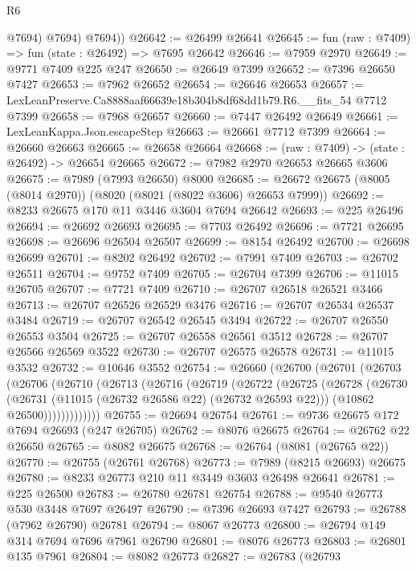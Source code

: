 \begin{lexlean}{R6}
\begin{coremodule}
            @7694)
          @7694)
        @7694))
@26642 := @26499 @26641
@26645 := fun (raw : @7409) => fun (state : @26492) => @7695 @26642
@26646 := @7959 @2970
@26649 := @9771 @7409 @225 @247
@26650 := @26649 @7399
@26652 := @7396 @26650 @7427
@26653 := @7962 @26652
@26654 := @26646 @26653
@26657 := LexLeanPreserve.Ca8888aaf66639e18b304b8df68dd1b79.R6.__fits_54 @7712 @7399
@26658 := @7968 @26657
@26660 := @7447 @26492 @26649
@26661 := LexLeanKappa.Json.escapeStep
@26663 := @26661 @7712 @7399
@26664 := @26660 @26663
@26665 := @26658 @26664
@26668 := (raw : @7409) -> (state : @26492) -> @26654 @26665
@26672 := @7982 @2970 @26653 @26665 @3606
@26675 := @7989 (@7993 @26650) @8000
@26685 := @26672 @26675 (@8005 (@8014 @2970)) (@8020 (@8021 (@8022 @3606) @26653 @7999))
@26692 := @8233 @26675 @170 @11 @3446 @3604 @7694 @26642
@26693 := @225 @26496
@26694 := @26692 @26693
@26695 := @7703 @26492
@26696 := @7721 @26695
@26698 := @26696 @26504 @26507
@26699 := @8154 @26492
@26700 := @26698 @26699
@26701 := @8202 @26492
@26702 := @7991 @7409
@26703 := @26702 @26511
@26704 := @9752 @7409
@26705 := @26704 @7399
@26706 := @11015 @26705
@26707 := @7721 @7409
@26710 := @26707 @26518 @26521 @3466
@26713 := @26707 @26526 @26529 @3476
@26716 := @26707 @26534 @26537 @3484
@26719 := @26707 @26542 @26545 @3494
@26722 := @26707 @26550 @26553 @3504
@26725 := @26707 @26558 @26561 @3512
@26728 := @26707 @26566 @26569 @3522
@26730 := @26707 @26575 @26578
@26731 := @11015 @3532
@26732 := @10646 @3552
@26754 := @26660
    (@26700
      (@26701
        (@26703
          (@26706
            (@26710
              (@26713
                (@26716
                  (@26719
                    (@26722
                      (@26725
                        (@26728
                          (@26730
                            (@26731 (@11015 (@26732 @26586 @22) (@26732 @26593 @22)))
                            (@10862 @26500)))))))))))))
@26755 := @26694 @26754
@26761 := @9736 @26675 @172 @7694 @26693 (@247 @26705)
@26762 := @8076 @26675
@26764 := @26762 @22 @26650
@26765 := @8082 @26675
@26768 := @26764 (@8081 (@26765 @22))
@26770 := @26755 (@26761 @26768)
@26773 := @7989 (@8215 @26693) @26675
@26780 := @8233 @26773 @210 @11 @3449 @3603 @26498 @26641
@26781 := @225 @26500
@26783 := @26780 @26781 @26754
@26788 := @9540 @26773 @530 @3448 @7697 @26497
@26790 := @7396 @26693 @7427
@26793 := @26788 (@7962 @26790) @26781
@26794 := @8067 @26773
@26800 := @26794 @149 @314 @7694 @7696 @7961 @26790
@26801 := @8076 @26773
@26803 := @26801 @135 @7961
@26804 := @8082 @26773
@26827 := @26783
    (@26793

\end{coremodule}
\end{lexlean}
